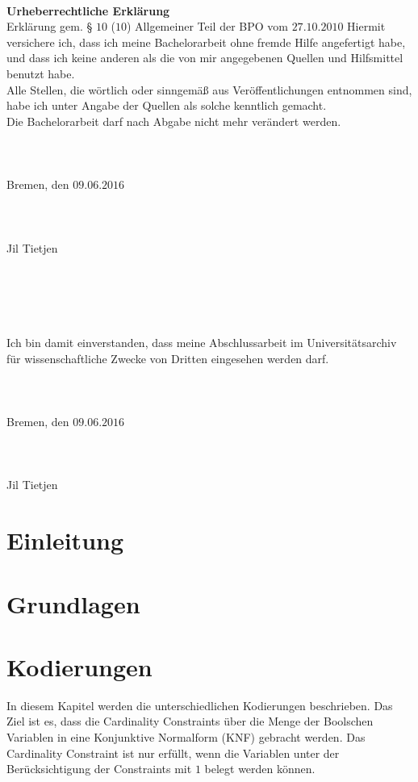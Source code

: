 \documentclass[a4,abstract=on]{scrartcl}
\newcommand*\stdsection{}
\let\stdsection\section
\renewcommand*\section{%
    \clearpage\ifodd\value{page}\else\mbox{}\clearpage\fi
    \stdsection}
\begin{document}
	\newpage
~\\
\textbf{Urheberrechtliche Erklärung}\\
Erklärung gem. § $10$ ($10$) Allgemeiner Teil der BPO vom $27$.$10$.$2010$
Hiermit versichere ich, dass ich meine Bachelorarbeit ohne fremde Hilfe angefertigt habe, und dass ich keine anderen als die von mir angegebenen Quellen und Hilfsmittel benutzt habe.\\
Alle Stellen, die wörtlich oder sinngemäß aus Veröffentlichungen entnommen sind, habe ich unter Angabe der Quellen als solche kenntlich gemacht.\\
Die Bachelorarbeit darf nach Abgabe nicht mehr verändert werden.\\
~\\~\\~\\
Bremen, den $09$.$06$.$2016$\\
~\\~\\~\\
Jil Tietjen
~\\~\\~\\~\\~\\~\\
Ich bin damit einverstanden, dass meine Abschlussarbeit im Universitätsarchiv für wissenschaftliche Zwecke von Dritten eingesehen werden darf.\\
~\\~\\~\\
Bremen, den $09$.$06$.$2016$\\
~\\~\\~\\
Jil Tietjen
\clearpage

	\tableofcontents
	\clearpage

\section{Einleitung}
\section{Grundlagen}
\section{Kodierungen}
In diesem Kapitel werden die unterschiedlichen Kodierungen beschrieben. Das Ziel ist es, dass die Cardinality Constraints über die Menge der Boolschen Variablen in eine Konjunktive Normalform (KNF) gebracht werden. %
Das Cardinality Constraint ist nur erfüllt, wenn die Variablen unter der Berücksichtigung der Constraints mit $1$ belegt werden können. 
\end{document}
